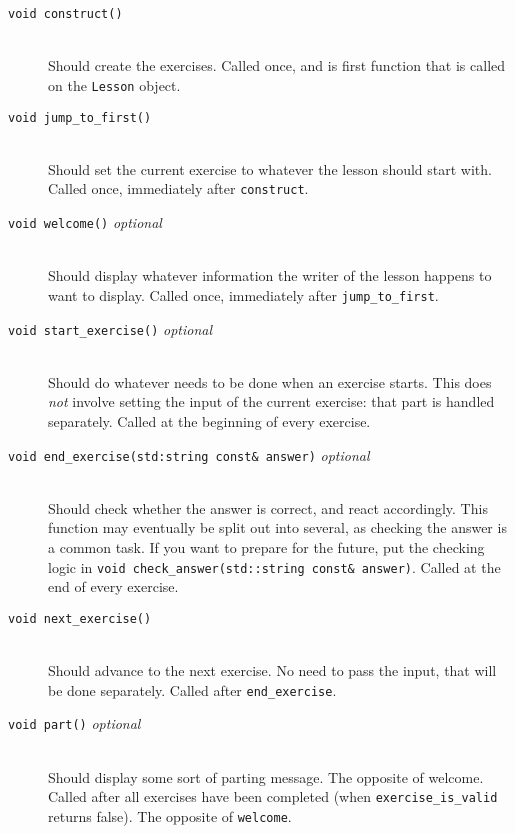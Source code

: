 \documentclass[12pt,a4paper]{report}
\begin{document}
		\begin{description}
			\item[\texttt{void construct()}] \hfill \\
				Should create the exercises.  Called once, and is first function
				that is called on the \texttt{Lesson} object.

			\item[\texttt{void jump\_to\_first()}] \hfill \\
				Should set the current exercise to whatever the lesson should
				start with.  Called once, immediately after \texttt{construct}.

			\item[\texttt{void welcome()} \textit{optional}] \hfill \\
				Should display whatever information the writer of the lesson
				happens to want to display.  Called once, immediately after
				\texttt{jump\_to\_first}.

			\item[\texttt{void start\_exercise()} \textit{optional}] \hfill \\
				Should do whatever needs to be done when an exercise starts.  This
				does \emph{not} involve setting the input of the current exercise:
				that part is handled separately.  Called at the beginning of every
				exercise.

			\item[\texttt{void end\_exercise(std:string const\& answer)} \textit{optional}] \hfill \\
				Should check whether the answer is correct, and react accordingly.
				This function may eventually be split out into several, as
				checking the answer is a common task.  If you want to prepare for
				the future, put the checking logic in
				\texttt{void check\_answer(std::string const\& answer)}.  Called at
				the end of every exercise.

			\item[\texttt{void next\_exercise()}] \hfill \\
				Should advance to the next exercise.  No need to pass the input,
				that will be done separately.  Called after \texttt{end\_exercise}.

			\item[\texttt{void part()} \textit{optional}] \hfill \\
				Should display some sort of parting message.  The opposite of
				welcome.  Called after all exercises have been completed (when
				\texttt{exercise\_is\_valid} returns false).  The opposite of
				\texttt{welcome}.


\end{description}
\end{document}
